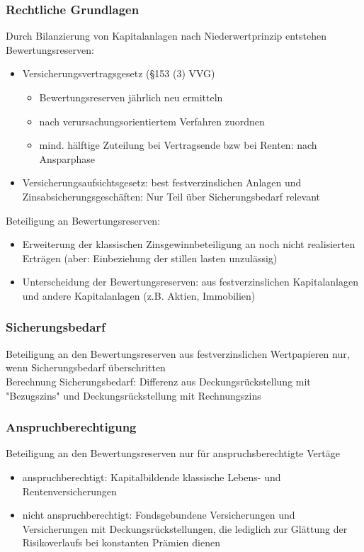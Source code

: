 \documentclass[12pt]{report}
\theoremstyle{dotless}
\theoremstyle{definition}
\begin{document}
\subsubsection{Rechtliche Grundlagen}
Durch Bilanzierung von Kapitalanlagen nach Niederwertprinzip entstehen Bewertungsreserven:
\begin{itemize}
\item Versicherungsvertragsgesetz (§153 (3) VVG)
\begin{itemize}
\item Bewertungsreserven jährlich neu ermitteln
\item nach verursachungsorientiertem Verfahren zuordnen
\item mind. hälftige Zuteilung bei Vertragsende bzw bei Renten: nach Ansparphase
\end{itemize}
\item Versicherungsaufsichtsgesetz: best festverzinslichen Anlagen und Zinsabsicherungsgeschäften: Nur Teil über Sicherungsbedarf relevant
\end{itemize}
Beteiligung an Bewertungsreserven:
\begin{itemize}
\item Erweiterung der klassischen Zinsgewinnbeteiligung an noch nicht realisierten Erträgen (aber: Einbeziehung der stillen lasten unzulässig)
\item Unterscheidung der Bewertungsreserven: aus festverzinslichen Kapitalanlagen und andere Kapitalanlagen (z.B. Aktien, Immobilien)
\end{itemize}

\subsubsection{Sicherungsbedarf}
Beteiligung an den Bewertungsreserven aus festverzinslichen Wertpapieren nur, wenn Sicherungsbedarf überschritten\\
Berechnung Sicherungsbedarf: Differenz aus Deckungsrückstellung mit "Bezugszins" und Deckungsrückstellung mit Rechnungszins

\subsubsection{Anspruchberechtigung}
Beteiligung an den Bewertungsreserven nur für anspruchsberechtigte Vertäge
\begin{itemize}
\item anspruchberechtigt: Kapitalbildende klassische Lebens- und Rentenversicherungen
\item nicht anspruchberechtigt: Fondsgebundene Versicherungen und Versicherungen mit Deckungsrückstellungen, die lediglich zur Glättung der Risikoverlaufs bei konstanten Prämien dienen
\end{itemize}
\end{document}
